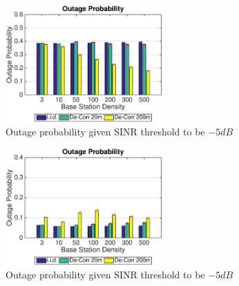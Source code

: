 \documentclass[journal,comsoc]{IEEEtran}
\begin{document}
\begin{figure}
\centering
\includegraphics[width=6cm]{NBMax1000OutageProbThresh-5iid.eps}
\caption{Outage probability given SINR threshold to be $-5dB$}
\label{fig: outprob1}
\end{figure}
\begin{figure}
\centering
\includegraphics[width=6cm]{MaxMax1000OutageProbThresh-5iid.eps}
\caption{Outage probability given SINR threshold to be $-5dB$}
\label{fig: outprobs2}
\end{figure}
\end{document}
